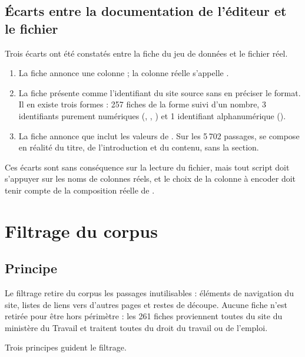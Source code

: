 \subsection{Écarts entre la documentation de l'éditeur et le fichier}

Trois écarts ont été constatés entre la fiche du jeu de données et le fichier réel.

\begin{enumerate}
\item La fiche annonce une colonne  ; la colonne réelle s'appelle .
\item La fiche présente  comme l'identifiant du site source sans en préciser le format. Il en
existe trois formes : 257 fiches de la forme  suivi d'un nombre, 3 identifiants purement
numériques (, , ) et 1 identifiant alphanumérique
().
\item La fiche annonce que  inclut les valeurs de . Sur les 5\,702 passages,
 se compose en réalité du titre, de l'introduction et du contenu, sans la section.
\end{enumerate}

Ces écarts sont sans conséquence sur la lecture du fichier, mais tout script doit s'appuyer sur les noms
de colonnes réels, et le choix de la colonne à encoder doit tenir compte de la composition réelle de
.

\section{Filtrage du corpus}\label{sec:filtrage}

\subsection{Principe}

Le filtrage retire du corpus les passages inutilisables : éléments de navigation du site, listes de
liens vers d'autres pages et restes de découpe. Aucune fiche n'est retirée pour être hors périmètre :
les 261 fiches proviennent toutes du site du ministère du Travail et traitent toutes du droit du
travail ou de l'emploi.

Trois principes guident le filtrage.

